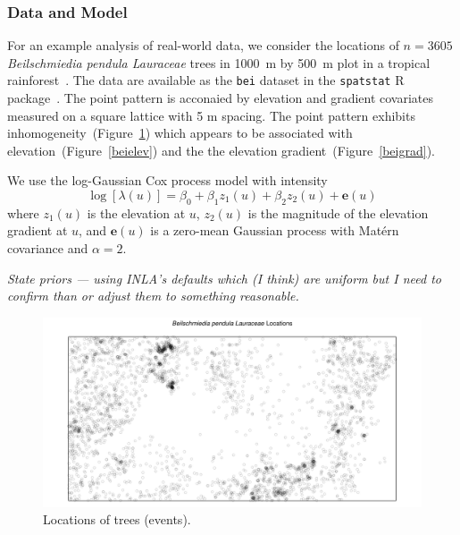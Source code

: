 \documentclass[]{interact}
\begin{document}
\subsubsection{Data and Model}

For an example analysis of real-world data, we consider the locations of
\(n = 3605\) \emph{Beilschmiedia pendula Lauraceae} trees in 1000~m by 500~m
plot in a tropical rainforest~\cite{moellerwaagepetersen}. The data are
available as the \texttt{bei} dataset in the \texttt{spatstat} R
package~\cite{spatstat}. The point pattern is acconaied by elevation and
gradient covariates measured on a square lattice with 5 m spacing. The point
pattern exhibits inhomogeneity~(Figure~\ref{bei}) which appears to be
associated with elevation~(Figure~\ref{beielev}) and the the elevation
gradient~(Figure~\ref{beigrad}).

We use the log-Gaussian Cox process model with intensity
\begin{displaymath}
\log\left[\lambda(u)\right] = \beta_{0} + \beta_{1} z_{1}(u)
+ \beta_{2} z_{2}(u) + \mathbf{e}(u)
\end{displaymath}
where \(z_{1}(u)\) is the elevation at \(u\), \(z_{2}(u)\) is the magnitude of
the elevation gradient at \(u\), and \(\mathbf{e}(u)\) is a zero-mean Gaussian
process with Mat\'{e}rn covariance and \(\alpha = 2\).

{\it State priors --- using INLA's defaults which (I think) are uniform but I
need to confirm than or adjust them to something reasonable.}

\begin{figure}[h]
\includegraphics[width=\textwidth]{figures/bei.pdf}
\caption{Locations of trees (events).}
\label{bei}
\end{figure}
\end{document}
